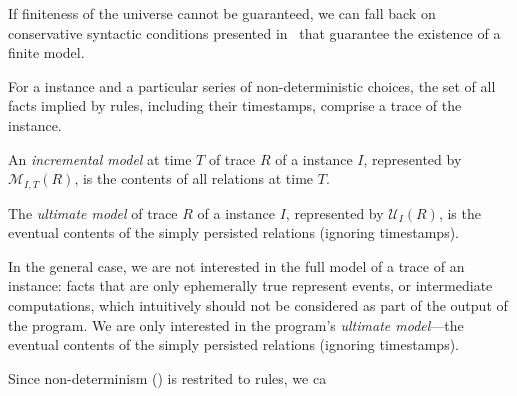 If finiteness of the universe cannot be guaranteed, we can fall back on
conservative syntactic conditions presented in~\cite{dedalus-techr} that
guarantee the existence of a finite model.


\begin{definition}
%
For a \lang instance and a particular series of non-deterministic choices, the
set of all facts implied by  rules, including their timestamps,
comprise a trace of the instance.
%
\end{definition}


\begin{definition}
%
An {\em incremental model} at time $T$ of trace $R$ of a \lang instance $I$,
represented by $\mathcal{M}_{I,T}(R)$, is the contents of all
relations at time $T$.
%
\end{definition}

\begin{definition}
%
The {\em ultimate model} of trace $R$ of a \lang instance $I$, represented by
$\mathcal{U}_I(R)$, is the eventual contents of the simply persisted relations
(ignoring timestamps).
%
\end{definition}

In the general case, we are not interested in the full model of a trace of an
instance: facts that are only ephemerally true represent events, or intermediate
computations, which intuitively should not be considered as part of the output
of the program.  We are only interested in the program's {\em ultimate
  model}---the eventual contents of the simply persisted relations (ignoring
timestamps).

Since non-determinism () is restrited to  rules, we ca



